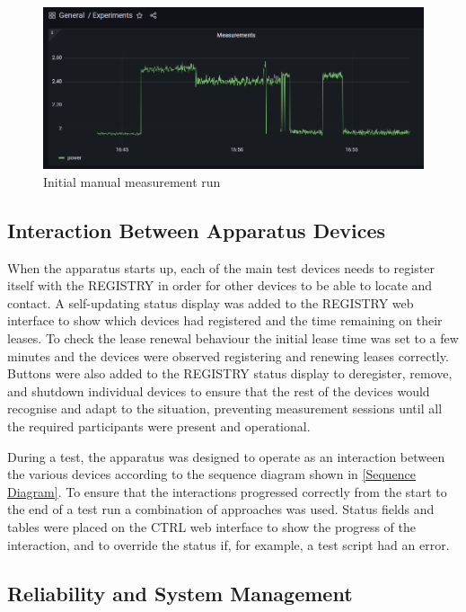 \begin{figure}[htbp]
  \centering
  \includegraphics[width=\columnwidth]{Figures/rig/run1.png}
  \caption{Initial manual measurement run}
  \label{Run 1}
\end{figure}

\subsection{Interaction Between Apparatus Devices}

When the apparatus starts up, each of the main test devices needs to register itself with the REGISTRY in order for other devices to be able to locate and contact. A self-updating status display was added to the REGISTRY web interface to show which devices had registered and the time remaining on their leases. To check the lease renewal behaviour the initial lease time was set to a few minutes and the devices were observed registering and renewing leases correctly. Buttons were also added to the REGISTRY status display to deregister, remove, and shutdown individual devices to ensure that the rest of the devices would recognise and adapt to the situation, preventing measurement sessions until all the required participants were present and operational.

During a test, the apparatus was designed to operate as an interaction between the various devices according to the sequence diagram shown in \autoref{Sequence Diagram}. To ensure that the interactions progressed correctly from the start to the end of a test run a combination of approaches was used. Status fields and tables were placed on the CTRL web interface to show the progress of the interaction, and to override the status if, for example, a test script had an error.

\subsection{Reliability and System Management}

